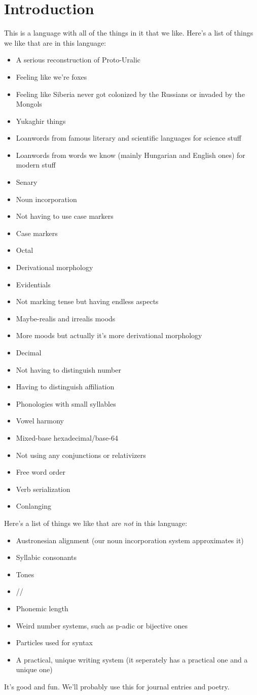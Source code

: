 \chapter{Introduction}
This is a language with all of the things in it that we like. Here's a list of
things we like that are in this language:
\begin{itemize}
  \item A serious reconstruction of Proto-Uralic
  \item Feeling like we're foxes
  \item Feeling like Siberia never got colonized by the Russians or invaded by
    the Mongols
  \item Yukaghir things
  \item Loanwords from famous literary and scientific languages for science
    stuff
  \item Loanwords from words we know (mainly Hungarian and English ones) for
    modern stuff
  \item Senary
  \item Noun incorporation
  \item Not having to use case markers
  \item Case markers
  \item Octal
  \item Derivational morphology
  \item Evidentials
  \item Not marking tense but having endless aspects
  \item Maybe-realis and irrealis moods
  \item More moods but actually it's more derivational morphology
  \item Decimal
  \item Not having to distinguish number
  \item Having to distinguish affiliation
  \item Phonologies with small syllables
  \item Vowel harmony
  \item Mixed-base hexadecimal/base-64
  \item Not using any conjunctions or relativizers
  \item Free word order
  \item Verb serialization
  \item Conlanging
\end{itemize}
Here's a list of things we like that are \emph{not} in this language:
\begin{itemize}
  \item Austronesian alignment (our noun incorporation system approximates it)
  \item Syllabic consonants
  \item Tones
  \item //
  \item Phonemic length
  \item Weird number systems, such as p-adic or bijective ones
  \item Particles used for syntax
  \item A practical, unique writing system (it seperately has a practical one
    and a unique one)
\end{itemize}
It's good and fun. We'll probably use this for journal entries and poetry.
